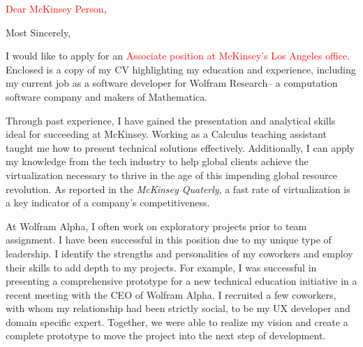 \documentclass[11pt,a4paper,unicode]{moderncv}
\begin{document}

\clearpage

\date{\today} %
\opening{\textcolor{red}{Dear McKinsey Person},} %
\closing{Most Sincerely,} %

\makelettertitle %
	I would like to apply for an \textcolor{red}{Associate position at McKinsey's Los Angeles office}. Enclosed is a copy of my CV highlighting my education and experience, including my current job as a software developer for Wolfram Research-- a computation software company and makers of Mathematica. 
		
\vspace{3mm}  
Through past experience, I have gained the presentation and analytical skills ideal for succeeding at McKinsey. Working as a Calculus teaching assistant taught me how to present technical solutions effectively. Additionally, I can apply my knowledge from the tech industry to help global clients achieve the virtualization necessary to thrive in the age of this impending global resource revolution. As reported in the \emph{McKinsey Quaterly}, a fast rate of virtualization is a key indicator of a company's competitiveness. 

\vspace{3mm}
At Wolfram Alpha, I often work on exploratory projects prior to team assignment. I have been successful in this position due to my unique type of leadership. I identify the strengths and personalities of my coworkers and employ their skills to add depth to my projects. For example, I was successful in presenting a comprehensive prototype for a new technical education initiative in a recent meeting with the CEO of Wolfram Alpha. I recruited a few coworkers, with whom my relationship had been strictly social, to be my UX developer and domain specific expert. Together, we were able to realize my vision and create a complete prototype to move the project into the next step of development.
\end{document}
